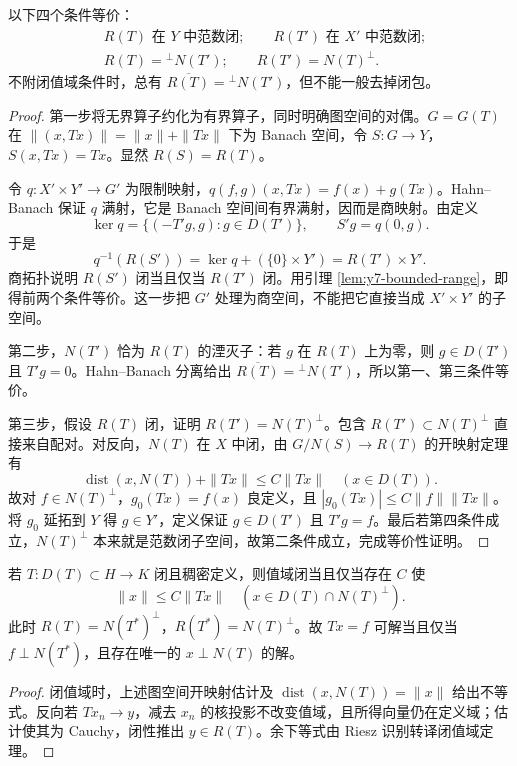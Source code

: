 \begin{theorem}\label{thm:y7-closed-range}
以下四个条件等价：
\[
 \begin{aligned}
 &R(T)\text{ 在 }Y\text{ 中范数闭};\qquad
 R(T')\text{ 在 }X'\text{ 中范数闭};\\
 &R(T)={}^\perp N(T');\qquad R(T')=N(T)^\perp.
 \end{aligned}
\]
不附闭值域条件时，总有 $\overline{R(T)}={}^\perp N(T')$，但不能一般去掉闭包。
\end{theorem}
\begin{proof}
第一步将无界算子约化为有界算子，同时明确图空间的对偶。$G=G(T)$ 在 $\|(x,Tx)\|=\|x\|+\|Tx\|$ 下为 Banach 空间，令 $S:G\to Y$，$S(x,Tx)=Tx$。显然 $R(S)=R(T)$。

令 $q:X'\times Y'\to G'$ 为限制映射，$q(f,g)(x,Tx)=f(x)+g(Tx)$。Hahn--Banach 保证 $q$ 满射，它是 Banach 空间间有界满射，因而是商映射。由定义
\[
 \ker q=\{(-T'g,g):g\in D(T')\},\qquad S'g=q(0,g).
\]
于是
\[
 q^{-1}(R(S'))=\ker q+(\{0\}\times Y')=R(T')\times Y'.
\]
商拓扑说明 $R(S')$ 闭当且仅当 $R(T')$ 闭。用引理 \ref{lem:y7-bounded-range}，即得前两个条件等价。这一步把 $G'$ 处理为商空间，不能把它直接当成 $X'\times Y'$ 的子空间。

第二步，$N(T')$ 恰为 $R(T)$ 的湮灭子：若 $g$ 在 $R(T)$ 上为零，则 $g\in D(T')$ 且 $T'g=0$。Hahn--Banach 分离给出 $\overline{R(T)}={}^\perp N(T')$，所以第一、第三条件等价。

第三步，假设 $R(T)$ 闭，证明 $R(T')=N(T)^\perp$。包含 $R(T')\subset N(T)^\perp$ 直接来自配对。对反向，$N(T)$ 在 $X$ 中闭，由 $G/N(S)\to R(T)$ 的开映射定理有
\[
 \operatorname{dist}(x,N(T))+\|Tx\|\le C\|Tx\|\quad(x\in D(T)).
\]
故对 $f\in N(T)^\perp$，$g_0(Tx)=f(x)$ 良定义，且 $|g_0(Tx)|\le C\|f\|\|Tx\|$。将 $g_0$ 延拓到 $Y$ 得 $g\in Y'$，定义保证 $g\in D(T')$ 且 $T'g=f$。最后若第四条件成立，$N(T)^\perp$ 本来就是范数闭子空间，故第二条件成立，完成等价性证明。
\end{proof}

\begin{corollary}
若 $T:D(T)\subset H\to K$ 闭且稠密定义，则值域闭当且仅当存在 $C$ 使
\[
 \|x\|\le C\|Tx\|\quad(x\in D(T)\cap N(T)^\perp).
\]
此时 $R(T)=N(T^*)^\perp$，$R(T^*)=N(T)^\perp$。故 $Tx=f$ 可解当且仅当 $f\perp N(T^*)$，且存在唯一的 $x\perp N(T)$ 的解。
\end{corollary}
\begin{proof}
闭值域时，上述图空间开映射估计及 $\operatorname{dist}(x,N(T))=\|x\|$ 给出不等式。反向若 $Tx_n\to y$，减去 $x_n$ 的核投影不改变值域，且所得向量仍在定义域；估计使其为 Cauchy，闭性推出 $y\in R(T)$。余下等式由 Riesz 识别转译闭值域定理。
\end{proof}

